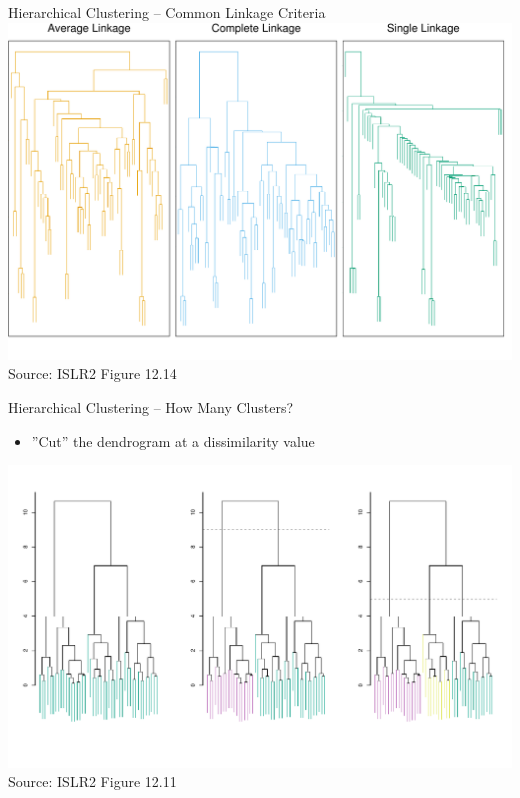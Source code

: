 \documentclass[ignorenonframetext,xcolor=x11names]{beamer}
\begin{document}
\begin{frame}{Hierarchical Clustering -- Common Linkage Criteria}
\centering
\includegraphics[width=\textwidth]{../class11/Figures_Chapters_7-13/Chapter12/12_14.pdf} \\

\scriptsize Source: ISLR2 Figure 12.14
\end{frame}
\begin{frame}{Hierarchical Clustering -- How Many Clusters?}
\begin{itemize}
  \item ''Cut'' the dendrogram at a dissimilarity value
\end{itemize}

\centering
\vspace{\baselineskip}
\includegraphics[width=\textwidth]{../class11/Figures_Chapters_7-13/Chapter12/12_11.pdf} \\

\scriptsize Source: ISLR2 Figure 12.11
\end{frame}
\end{document}
